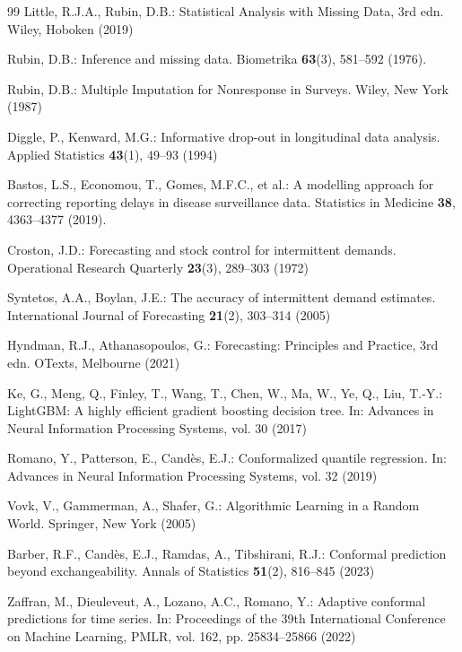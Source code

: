 \documentclass[runningheads]{llncs}
\begin{document}
\begin{thebibliography}{99}
Little, R.J.A., Rubin, D.B.: Statistical Analysis with Missing Data, 3rd edn. Wiley, Hoboken (2019)

Rubin, D.B.: Inference and missing data. Biometrika \textbf{63}(3), 581--592 (1976). 

Rubin, D.B.: Multiple Imputation for Nonresponse in Surveys. Wiley, New York (1987)

Diggle, P., Kenward, M.G.: Informative drop-out in longitudinal data analysis. Applied Statistics \textbf{43}(1), 49--93 (1994)

Bastos, L.S., Economou, T., Gomes, M.F.C., et al.: A modelling approach for correcting reporting delays in disease surveillance data. Statistics in Medicine \textbf{38}, 4363--4377 (2019). 

Croston, J.D.: Forecasting and stock control for intermittent demands. Operational Research Quarterly \textbf{23}(3), 289--303 (1972)

Syntetos, A.A., Boylan, J.E.: The accuracy of intermittent demand estimates. International Journal of Forecasting \textbf{21}(2), 303--314 (2005)

Hyndman, R.J., Athanasopoulos, G.: Forecasting: Principles and Practice, 3rd edn. OTexts, Melbourne (2021)

Ke, G., Meng, Q., Finley, T., Wang, T., Chen, W., Ma, W., Ye, Q., Liu, T.-Y.: LightGBM: A highly efficient gradient boosting decision tree. In: Advances in Neural Information Processing Systems, vol. 30 (2017)

Romano, Y., Patterson, E., Cand\`es, E.J.: Conformalized quantile regression. In: Advances in Neural Information Processing Systems, vol. 32 (2019)

Vovk, V., Gammerman, A., Shafer, G.: Algorithmic Learning in a Random World. Springer, New York (2005)

Barber, R.F., Cand\`es, E.J., Ramdas, A., Tibshirani, R.J.: Conformal prediction beyond exchangeability. Annals of Statistics \textbf{51}(2), 816--845 (2023)

Zaffran, M., Dieuleveut, A., Lozano, A.C., Romano, Y.: Adaptive conformal predictions for time series. In: Proceedings of the 39th International Conference on Machine Learning, PMLR, vol. 162, pp. 25834--25866 (2022)


\end{thebibliography}
\end{document}
